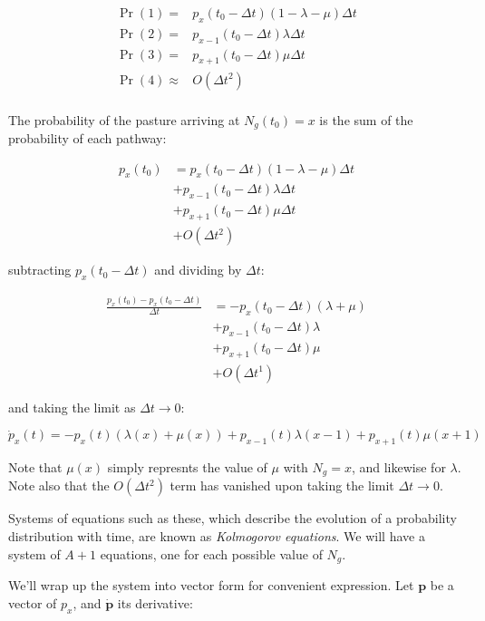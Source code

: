\documentclass{article}
\begin{document}
\begin{align*}
    \Pr(1)=&p_x(t_0-\Delta t)(1-\lambda-\mu)\Delta t\\
    \Pr(2)=&p_{x-1}(t_0-\Delta t)\lambda\Delta t\\
    \Pr(3)=&p_{x+1}(t_0-\Delta t)\mu\Delta t\\
    \Pr(4)\approx&O(\Delta t^2)\\
\end{align*}

The probability of the pasture arriving at $N_g(t_0)=x$ is the sum of the probability of each pathway:

\begin{align*}
    p_x(t_0)&=p_x(t_0-\Delta t)(1-\lambda-\mu)\Delta t\\
    &+p_{x-1}(t_0-\Delta t)\lambda\Delta t\\
    &+p_{x+1}(t_0-\Delta t)\mu\Delta t\\
    &+O(\Delta t^2)
\end{align*}

subtracting $p_x(t_0-\Delta t)$ and dividing by $\Delta t$:

\begin{align*}
    \frac{p_x(t_0)-p_x(t_0-\Delta t)}{\Delta t}&=-p_x(t_0-\Delta t)(\lambda+\mu)\\
    &+p_{x-1}(t_0-\Delta t)\lambda\\
    &+p_{x+1}(t_0-\Delta t)\mu\\
    &+O(\Delta t^1)
\end{align*}

and taking the limit as $\Delta t\rightarrow 0$:

\begin{equation}
    \label{p_dot}
    \dot{p}_x(t)=-p_x(t)(\lambda(x)+\mu(x))+p_{x-1}(t)\lambda(x-1)+p_{x+1}(t)\mu(x+1)
\end{equation}

Note that $\mu(x)$ simply represnts the value of $\mu$ with $N_g=x$, and likewise for $\lambda$. Note also that the $O(\Delta t^2)$ term has vanished upon taking the limit $\Delta t\rightarrow 0$.

Systems of equations such as these, which describe the evolution of a probability distribution with time, are known as \textit{Kolmogorov equations}. We will have a system of $A+1$ equations, one for each possible value of $N_g$.

We'll wrap up the system into vector form for convenient expression. Let $\mathbf{p}$ be a vector of $p_x$, and $\dot{\mathbf{p}}$ its derivative:
\end{document}
